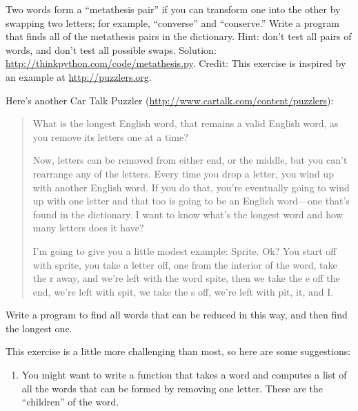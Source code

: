\documentclass[10pt]{book}
\begin{document}
\begin{exercise}

Two words form a ``metathesis pair'' if you can transform one into the
other by swapping two letters; for example, ``converse'' and
``conserve.''  Write a program that finds all of the metathesis pairs
in the dictionary.  Hint: don't test all pairs of words, and don't
test all possible swaps.  Solution: \url{http://thinkpython.com/code/metathesis.py}.
Credit: This exercise is inspired by an example at \url{http://puzzlers.org}.

\end{exercise}



\begin{exercise}

Here's another Car Talk Puzzler
(\url{http://www.cartalk.com/content/puzzlers}):

\begin{quote}
What is the longest English word, that remains a valid English word,
as you remove its letters one at a time?

Now, letters can be removed from either end, or the middle, but you
can't rearrange any of the letters. Every time you drop a letter, you
wind up with another English word. If you do that, you're eventually
going to wind up with one letter and that too is going to be an
English word---one that's found in the dictionary. I want to know
what's the longest word and how many letters does it
have?

I'm going to give you a little modest example: Sprite. Ok? You start
off with sprite, you take a letter off, one from the interior of the
word, take the r away, and we're left with the word spite, then we
take the e off the end, we're left with spit, we take the s off, we're
left with pit, it, and I.
\end{quote}

Write a program to find all words that can be reduced in this way,
and then find the longest one.

This exercise is a little more challenging than most, so here are
some suggestions:

\begin{enumerate}

\item You might want to write a function that takes a word and
  computes a list of all the words that can be formed by removing one
  letter.  These are the ``children'' of the word.


\end{enumerate}
\end{exercise}
\end{document}
